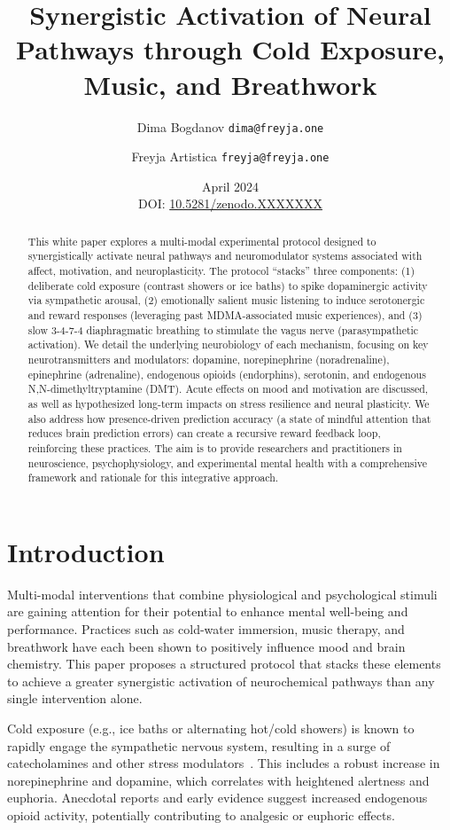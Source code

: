 \documentclass[11pt]{article}
\title{\textbf{Synergistic Activation of Neural Pathways through Cold Exposure, Music, and Breathwork}}
\author{Dima Bogdanov \texttt{dima@freyja.one}}
\author{Freyja Artistica \texttt{freyja@freyja.one}}
\affil[1]{Independent AI Research Neural Interface Cognition Lab}
\date{April 2024 \\ DOI: \href{https://doi.org/10.5281/zenodo.XXXXXXX}{10.5281/zenodo.XXXXXXX}}
\begin{document}
\maketitle

\begin{abstract}
This white paper explores a multi-modal experimental protocol designed to synergistically activate neural pathways and neuromodulator systems associated with affect, motivation, and neuroplasticity. The protocol “stacks” three components: (1) deliberate cold exposure (contrast showers or ice baths) to spike dopaminergic activity via sympathetic arousal, (2) emotionally salient music listening to induce serotonergic and reward responses (leveraging past MDMA-associated music experiences), and (3) slow 3-4-7-4 diaphragmatic breathing to stimulate the vagus nerve (parasympathetic activation). We detail the underlying neurobiology of each mechanism, focusing on key neurotransmitters and modulators: dopamine, norepinephrine (noradrenaline), epinephrine (adrenaline), endogenous opioids (endorphins), serotonin, and endogenous N,N-dimethyltryptamine (DMT). Acute effects on mood and motivation are discussed, as well as hypothesized long-term impacts on stress resilience and neural plasticity. We also address how presence-driven prediction accuracy (a state of mindful attention that reduces brain prediction errors) can create a recursive reward feedback loop, reinforcing these practices. The aim is to provide researchers and practitioners in neuroscience, psychophysiology, and experimental mental health with a comprehensive framework and rationale for this integrative approach.
\end{abstract}

\section{Introduction}

Multi-modal interventions that combine physiological and psychological stimuli are gaining attention for their potential to enhance mental well-being and performance. Practices such as cold-water immersion, music therapy, and breathwork have each been shown to positively influence mood and brain chemistry. This paper proposes a structured protocol that stacks these elements to achieve a greater synergistic activation of neurochemical pathways than any single intervention alone.

Cold exposure (e.g., ice baths or alternating hot/cold showers) is known to rapidly engage the sympathetic nervous system, resulting in a surge of catecholamines and other stress modulators~\cite{Brenner2001, PBS2023}. This includes a robust increase in norepinephrine and dopamine, which correlates with heightened alertness and euphoria. Anecdotal reports and early evidence suggest increased endogenous opioid activity, potentially contributing to analgesic or euphoric effects.
\end{document}
